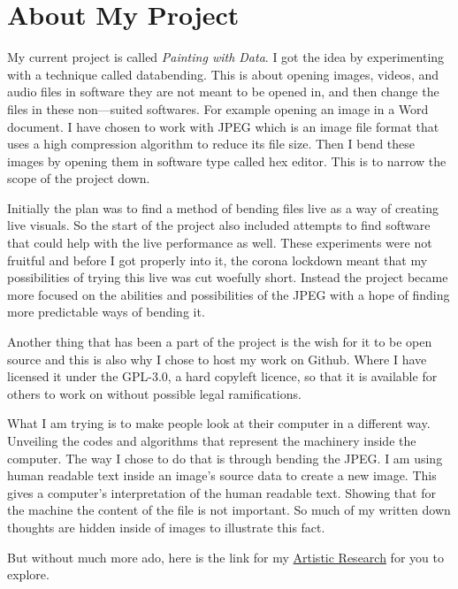 \documentclass[12pt, letterpaper]{article}
\begin{document}
\section{About My Project}
My current project is called \textit{Painting with Data}. I got the idea by
experimenting
with a technique called databending. This is about opening images,
videos, and audio files in software they are not meant to be opened in, and then
change the files in these non---suited softwares. For example opening an image
in a Word document. I have chosen to work with JPEG  which is an
image file format that uses a high compression algorithm to reduce its file
size. Then I bend these images by opening them in software type called
hex editor. This is to narrow the scope of the project down.
\par
Initially the plan was to find a method of bending files live as a way of
creating
live visuals. So the start of the project also included attempts to find
software that
could help with the live performance as well. These experiments were not
fruitful and before I got properly into it, the corona lockdown meant that my
possibilities of trying this live was cut woefully short. Instead the project
became more focused on the abilities and possibilities of the JPEG with a
hope of finding more predictable ways of bending it.
\par
Another thing that has been a part of the project is the wish for it to be open
source and this is also why I chose to host my work on Github. Where I have
licensed it under the GPL-3.0, a hard copyleft licence, so that it is available
for others to work on without possible legal ramifications.
\par
What I am trying is to make people look at their computer in a different way.
Unveiling the codes and algorithms that represent the machinery inside the
computer. The way I chose to do that is through bending the JPEG\@. I am using
human readable text inside an image's source data to create a new image. This
gives a computer's interpretation of the human readable text. Showing that for
the machine the content of the file is not important. So much of my written down
thoughts are hidden inside of images to illustrate this fact.
\par
\medskip
\noindent But without much more ado, here is the link for my
\href{https://github.com/aa-83/artistic_research}{Artistic Research} for you
to explore.
\end{document}
